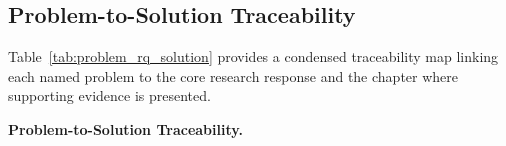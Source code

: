\subsection{Problem-to-Solution Traceability}
\label{sec:problem_solution_trace}

Table~\ref{tab:problem_rq_solution} provides a condensed traceability map linking each named problem to the core research response and the chapter where supporting evidence is presented.

\noindent\textbf{Problem-to-Solution Traceability.}

